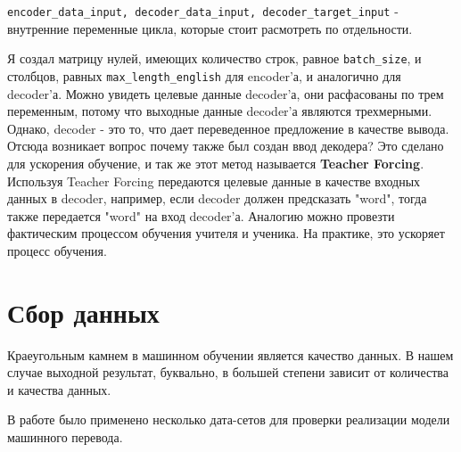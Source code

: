 \documentclass[a4paper,12pt]{article}
\begin{document}
    \texttt{encoder_data_input, decoder_data_input, decoder_target_input} - внутренние переменные цикла, которые стоит расмотреть по отдельности. 
	
	Я создал матрицу нулей, имеющих количество строк, равное \texttt{batch_size}, и столбцов, равных \texttt{max_length_english} для encoder'а, и аналогично для decoder'а. Можно увидеть целевые данные decoder'а, они расфасованы по трем переменным, потому что выходные данные decoder'а являются трехмерными. Однако, decoder - это то, что дает переведенное предложение в качестве вывода. Отсюда возникает вопрос почему также был создан ввод декодера? Это сделано для ускорения обучение, и так же этот метод называется \textbf{Teacher Forcing}. Используя Teacher Forcing передаются целевые данные в качестве входных данных в decoder, например, если decoder должен предсказать "word", тогда также передается "word" на вход decoder'а. Аналогию можно провезти  фактическим процессом обучения учителя и ученика. На практике, это ускоряет процесс обучения.
	
	\clearpage
	
	\section{Сбор данных}
	
	Краеугольным камнем в машинном обучении является качество данных. В нашем случае выходной результат, буквально, в большей степени зависит от количества и качества данных.
	
	В работе было применено несколько дата-сетов для проверки реализации модели машинного перевода.
	
\end{document}
